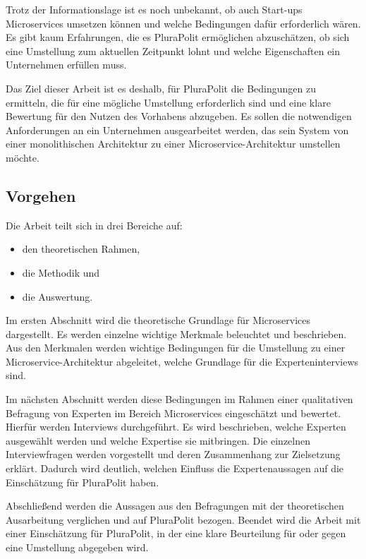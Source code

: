 Trotz der Informationslage ist es noch unbekannt, ob auch Start-ups Microservices umsetzen können und welche Bedingungen dafür erforderlich wären. Es gibt kaum Erfahrungen, die es PluraPolit ermöglichen abzuschätzen, ob sich eine Umstellung zum aktuellen Zeitpunkt lohnt und welche Eigenschaften ein Unternehmen erfüllen muss.

Das Ziel dieser Arbeit ist es deshalb, für PluraPolit die Bedingungen zu ermitteln, die für eine mögliche Umstellung erforderlich sind und eine klare Bewertung für den Nutzen des Vorhabens abzugeben. Es sollen die notwendigen Anforderungen an ein Unternehmen ausgearbeitet werden, das sein System von einer monolithischen Architektur zu einer Microservice-Architektur umstellen möchte.


\subsection{Vorgehen}

Die Arbeit teilt sich in drei Bereiche auf: 
\begin{itemize}
	\item den theoretischen Rahmen,
	\item die Methodik und
	\item die Auswertung.
\end{itemize}

Im ersten Abschnitt wird die theoretische Grundlage für Microservices dargestellt. Es werden einzelne wichtige Merkmale beleuchtet und beschrieben. Aus den Merkmalen werden wichtige Bedingungen für die Umstellung zu einer Microservice-Architektur abgeleitet, welche Grundlage für die Experteninterviews sind.

Im nächsten Abschnitt werden diese Bedingungen im Rahmen einer qualitativen Befragung von Experten im Bereich Microservices eingeschätzt und bewertet. Hierfür werden Interviews durchgeführt. Es wird beschrieben, welche Experten ausgewählt werden und welche Expertise sie mitbringen. Die einzelnen Interviewfragen werden vorgestellt und deren Zusammenhang zur Zielsetzung erklärt. Dadurch wird deutlich, welchen Einfluss die Expertenaussagen auf die Einschätzung für PluraPolit haben.

Abschließend werden die Aussagen aus den Befragungen mit der theoretischen Ausarbeitung verglichen und auf PluraPolit bezogen. Beendet wird die Arbeit mit einer Einschätzung für PluraPolit, in der eine klare Beurteilung für oder gegen eine Umstellung abgegeben wird.
